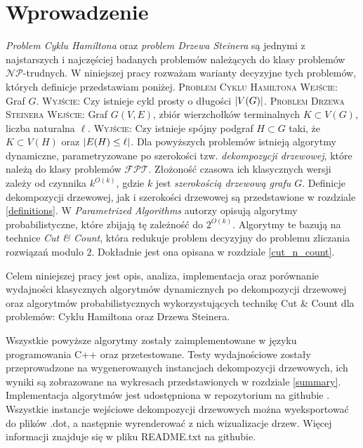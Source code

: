 \documentclass[12pt, oneside]{report}
\newcommand\Omicron{O}
\begin{document}
  	\chapter{Wprowadzenie}
	\emph{Problem Cyklu Hamiltona} oraz \emph{problem Drzewa Steinera} są jednymi z najstarszych i najczęściej badanych problemów należących do klasy problemów $\mathcal{NP}$-trudnych. W niniejszej pracy rozważam warianty decyzyjne tych problemów, których definicje przedstawiam poniżej. 
\newline\newline
\textsc{Problem Cyklu Hamiltona}
\newline
\textsc{ Wejście:} Graf $G$.
\newline
\textsc{ Wyjście:} Czy istnieje cykl prosty o długości $\abs{V(G)}$.
\newline\newline
\textsc{Problem Drzewa Steinera}
\newline
\textsc{ Wejście:} Graf $G(V,E)$, zbiór wierzchołków terminalnych $K \subset V(G)$, liczba naturalna $\ell$.
\newline
\textsc{ Wyjście:} Czy istnieje spójny podgraf $H \subset G$ taki, że $K \subset V(H)$ oraz $\abs{E(H) \leq \ell}$.
\newline\newline
Dla powyższych problemów istnieją algorytmy dynamiczne, parametryzowane po szerokości tzw. \emph{dekompozycji drzewowej}, które należą do klasy problemów $\mathcal{FPT}$. Złożoność czasowa ich klasycznych wersji zależy od czynnika $k^{\Omicron(k)}$, gdzie $k$ jest \emph{szerokością drzewową grafu $G$}. Definicje dekompozycji drzewowej, jak i szerokości drzewowej są przedstawione w rozdziale \ref{definitions}. W \emph{Parametrized Algorithms} \cite{parametrized_algorithms} autorzy opisują algorytmy probabilistyczne, które zbijają tę zależność do $2^{\Omicron(k)}$. Algorytmy te bazują na technice \emph{Cut \& Count}, która redukuje problem decyzyjny do problemu zliczania rozwiązań modulo $2$. Dokładnie jest ona opisana w rozdziale \ref{cut_n_count}.

Celem niniejszej pracy jest opis, analiza, implementacja oraz porównanie wydajności klasycznych algorytmów dynamicznych po dekompozycji drzewowej oraz algorytmów probabilistycznych wykorzystujących technikę Cut \& Count dla problemów: Cyklu Hamiltona oraz Drzewa Steinera. 

Wszystkie powyższe algorytmy zostały zaimplementowane w języku programowania C++ oraz przetestowane. Testy wydajnościowe zostały przeprowadzone na wygenerowanych instancjach dekompozycji drzewowych, ich wyniki są zobrazowane na wykresach przedstawionych w rozdziale \ref{summary}. Implementacja algorytmów jest udostępniona w repozytorium na githubie \cite{github}. Wszystkie instancje wejściowe dekompozycji drzewowych można wyeksportować do plików .dot, a następnie wyrenderować z nich wizualizacje drzew. Więcej informacji znajduje się w pliku README.txt na githubie.  
\end{document}

